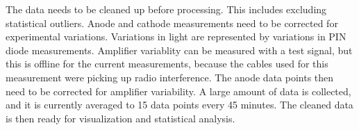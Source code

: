 The data needs to be cleaned up before processing.  This includes excluding statistical outliers.  Anode and cathode measurements need to be corrected for experimental variations.  Variations in light are represented by variations in PIN diode measurements.  Amplifier variablity can be measured with a test signal, but this is offline for the current measurements, because the cables used for this measurement were picking up radio interference.  The anode data points then need to be corrected for amplifier variability.  A large amount of data is collected, and it is currently averaged to 15 data points every 45 minutes.  The cleaned data is then ready for visualization and statistical analysis.


